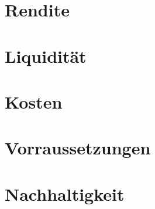 \documentclass[10pt,a4paper, ngerman]{beamer}
\begin{document}
\section{Rendite}


\section{Liquidität}


\section{Kosten}


\section{Vorraussetzungen}


\section{Nachhaltigkeit}
\end{document}
